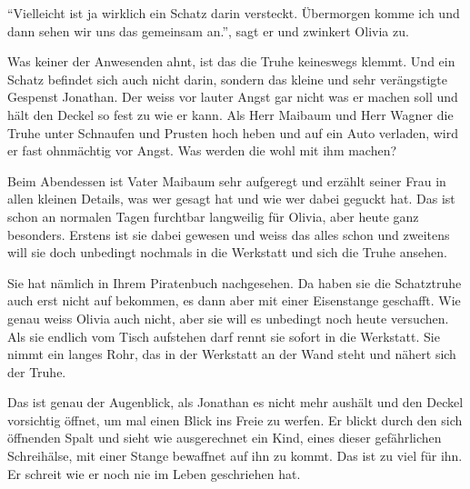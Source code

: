 \enquote{Vielleicht ist ja wirklich ein Schatz darin versteckt. Übermorgen komme ich und dann sehen wir uns das gemeinsam an.}, sagt er und zwinkert Olivia zu. 

Was keiner der Anwesenden ahnt, ist das die Truhe keineswegs klemmt. Und ein Schatz befindet sich auch nicht darin, sondern das kleine und sehr verängstigte Gespenst Jonathan. Der weiss vor lauter Angst gar nicht was er machen soll und hält den Deckel so fest zu wie er kann. Als Herr Maibaum und Herr Wagner die Truhe unter Schnaufen und Prusten hoch heben und auf ein Auto verladen, wird er fast ohnmächtig vor Angst. Was werden die wohl mit ihm machen?

Beim Abendessen ist Vater Maibaum sehr aufgeregt und erzählt seiner Frau in allen kleinen Details, was wer gesagt hat und wie wer dabei geguckt hat. Das ist schon an normalen Tagen furchtbar langweilig für Olivia, aber heute ganz besonders. Erstens ist sie dabei gewesen und weiss das alles schon und zweitens will sie doch unbedingt nochmals in die Werkstatt und sich die Truhe ansehen. 

Sie hat nämlich in Ihrem Piratenbuch nachgesehen. Da haben sie die Schatztruhe auch erst nicht auf bekommen, es dann aber mit einer Eisenstange geschafft. Wie genau weiss Olivia auch nicht, aber sie will es unbedingt noch heute versuchen. Als sie endlich vom Tisch aufstehen darf rennt sie sofort in die Werkstatt. Sie nimmt ein langes Rohr, das in der Werkstatt an der Wand steht und nähert sich der Truhe.

Das ist genau der Augenblick, als Jonathan es nicht mehr aushält und den Deckel vorsichtig öffnet, um mal einen Blick ins Freie zu werfen. Er blickt durch den sich öffnenden Spalt und sieht wie ausgerechnet ein Kind, eines dieser gefährlichen Schreihälse, mit einer Stange bewaffnet auf ihn zu kommt. Das ist zu viel für ihn. Er schreit wie er noch nie im Leben geschriehen hat.

